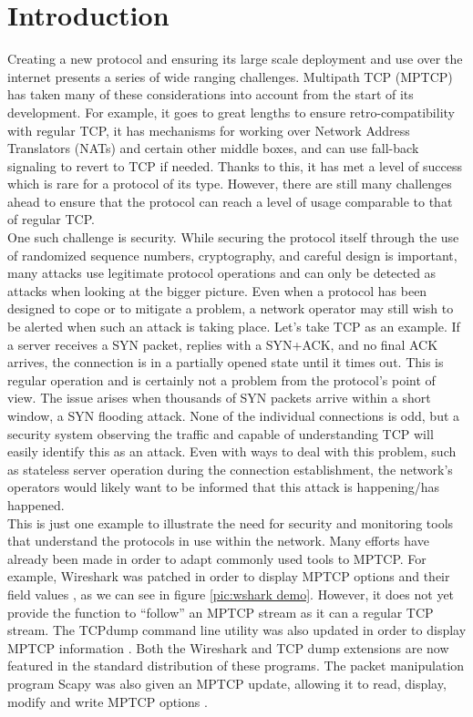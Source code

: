 \chapter{Introduction} \label{chap:intro}
Creating a new protocol and ensuring its large scale deployment and use over the internet presents a series of wide ranging challenges. Multipath TCP (MPTCP) has taken many of these considerations into account from the start of its development. For example, it goes to great lengths to ensure retro-compatibility with regular TCP, it has mechanisms for working over Network Address Translators (NATs) and certain other middle boxes, and can use fall-back signaling to revert to TCP if needed. Thanks to this, it has met a level of success which is rare for a protocol of its type. However, there are still many challenges ahead to ensure that the protocol can reach a level of usage comparable to that of regular TCP. \\

One such challenge is security. While securing the protocol itself through the use of randomized  sequence numbers, cryptography, and careful design is important, many attacks use legitimate protocol operations and can only be detected as attacks when looking at the bigger picture. Even when a protocol has been designed to cope or to mitigate a problem, a network operator may still wish to be alerted when such an attack is taking place. Let's take TCP as an example. If a server receives a SYN packet, replies with a SYN+ACK, and no final ACK arrives, the connection is in a partially opened state until it times out. This is regular operation and is certainly not a problem from the protocol's point of view. The issue arises when thousands of SYN packets arrive within a short window, a SYN flooding attack. None of the individual connections is odd, but a security system observing the traffic and capable of understanding TCP will easily identify this as an attack. Even with ways to deal with this problem, such as stateless server operation during the connection establishment, the network's operators would likely want to be informed that this attack is happening/has happened. \\

This is just one example to illustrate the need for security and monitoring tools that understand the protocols in use within the network. Many efforts have already been made in order to adapt commonly used tools to MPTCP. For example, Wireshark \cite{wireshark} was patched in order to display MPTCP options and their field values \cite{mpwireshark}, as we can  see in figure \ref{pic:wshark demo}. However, it does not yet provide the function to ``follow'' an MPTCP stream as it can a regular TCP stream. The TCPdump \cite{tcpdump} command line utility was also updated in order to display MPTCP information \cite{mptcpdump}. Both the Wireshark and TCP dump extensions are now featured in the standard distribution of these programs. The packet manipulation program Scapy \cite{scapy} was also given an MPTCP update, allowing it to read, display, modify and write MPTCP options \cite{mpscapy} .   \\

